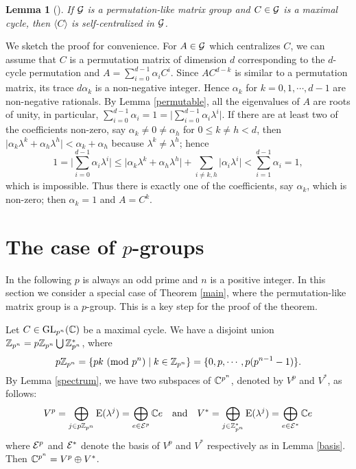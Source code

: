 \documentclass{article}
\newtheorem{lemma}[theorem]{Lemma}
\numberwithin{equation}{section}
\begin{document}
\begin{lemma}[{\cite[Proposition 4.2]{C07}}]\label{self-centralized}
If ${\cal G}$ is a permutation-like matrix group and
$C\in{\cal G}$ is a maximal cycle, then $\langle C\rangle$ 
is self-centralized in ${\cal G}$. 
\end{lemma}

We sketch the proof for convenience. For $A\in{\cal G}$ which centralizes $C$, 
we can assume that $C$ is a permutation matrix of dimension $d$ corresponding to 
the $d$-cycle permutation and $A=\sum_{i=0}^{d-1}\alpha_iC^i$.
Since $AC^{d-k}$ is similar to a permutation matrix, its trace $d\alpha_k$
is a non-negative integer. Hence $\alpha_k$ for $k=0,1,\cdots,d-1$
are non-negative rationals. By Lemma \ref{permutable},
all the eigenvalues of $A$ are roots of unity, in particular,
$\sum_{i=0}^{d-1}\alpha_i =1 =\big|\sum_{i=0}^{d-1}\alpha_i\lambda^i \big|$.
If there are at least two of the coefficients non-zero, say $\alpha_k\ne 0\ne \alpha_h$
for $0\le k\ne h<d$, then 
$\big|\alpha_k\lambda^k+\alpha_h\lambda^h\big|<\alpha_k+\alpha_h$
because $\lambda^k\ne\lambda^h$; hence
$$
1=\Big|\sum_{i=0}^{d-1}\alpha_i\lambda^i \Big|\le
\big|\alpha_k\lambda^k+\alpha_h\lambda^h\big|+
 \sum_{i\ne k,h}\big|\alpha_i\lambda^i\big|<\sum_{i=1}^{d-1}\alpha_i=1,
$$
which is impossible. Thus there is exactly one of the coefficients, say $\alpha_k$,
which is non-zero; then $\alpha_k=1$ and $A=C^k$.


\section{The case of $p$-groups} \label{case p group}

In the following $p$ is always an odd prime and $n$ is a positive integer.
In this section we consider a special case of Theorem \ref{main},
where the permutation-like matrix group is a $p$-group.
This is a key step for the proof of the theorem.

Let $C\in{\rm GL}_{p^n}({\Bbb C})$ be a maximal cycle.
We have a disjoint union
${\Bbb Z}_{p^n}=p{\Bbb Z}_{p^n}\bigcup {\Bbb Z}_{p^n}^*$, where 
$$p{\Bbb Z}_{p^n}=\{pk~({\rm mod}~p^n)\mid k\in{\Bbb Z}_{p^n}\}
 =\{0,p,\cdots,p(p^{n-1}-1)\}.$$
By Lemma \ref{spectrum}, we have two subspaces of ${\Bbb C}^{p^n}$,
denoted by $V^p$ and $V^*$,  as follows:
\begin{equation}\label{VpV*}
V^{p} =\bigoplus_{j\in p{\Bbb Z}_{p^n}}{\rm E}(\lambda^j)
=\bigoplus_{e\in{\cal E}^p}{\Bbb C}e
\quad\mbox{and}\quad
 V^{*} =\bigoplus_{j\in {\Bbb Z}_{p^n}^*}{\rm E}(\lambda^j)
=\bigoplus_{e\in{\cal E}^*}{\Bbb C}e
\end{equation}
where ${\cal E}^p$ and ${\cal E}^*$ denote the basis
of $V^p$ and $V^*$ respectively as in Lemma \ref{basis}.
Then ${\Bbb C}^{p^n}=V^p\oplus V^*$.
\end{document}
